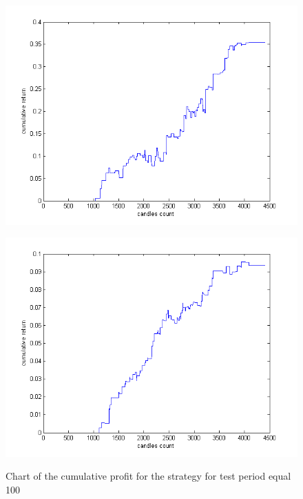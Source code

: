 \documentclass{tewiart}
\begin{document}
\begin{figure}[h!]
\begin{minipage}{.49\linewidth}
\begin{center}
\includegraphics[width=\textwidth]{pictures/mic_100.png}
\label{MiC100}
\end{center}
\end{minipage}
\begin{minipage}{.49\linewidth}
\begin{center}
\includegraphics[width=\textwidth]{pictures/mid_100.png}
\label{MiD100}
\end{center}
\end{minipage}

\caption{Chart of the cumulative profit for the strategy for test period equal 100}
\end{figure}
\FloatBarrier
\end{document}
